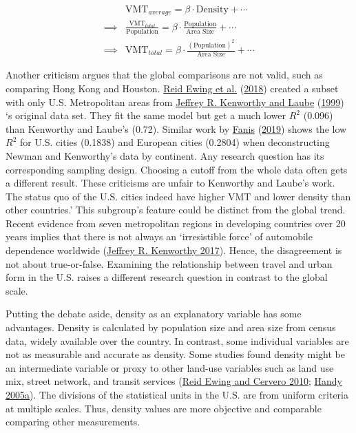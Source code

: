 \documentclass[
  12pt,
]{article}
\begin{document}
\begin{equation}
\begin{split}
 & \text{VMT}_{average}  =\beta\cdot  \text{Density}  +\cdots\\ 
\implies & \frac{\text{VMT}_{total}}{\text{Population}}  = \beta\cdot  \frac{\text{Population}}{\text{Area Size}}  +\cdots\\
\implies & \text{VMT}_{total} = \beta\cdot  \frac{(\text{Population})^2}{\text{Area Size}}  +\cdots
\end{split}
\label{eq:hyperbolic}
\end{equation}

Another criticism argues that the global comparisons are not valid, such as comparing Hong Kong and Houston. \protect\hyperlink{ref-ewingTestingNewmanKenworthy2018}{Reid Ewing et al.} (\protect\hyperlink{ref-ewingTestingNewmanKenworthy2018}{2018}) created a subset with only U.S. Metropolitan areas from \protect\hyperlink{ref-kenworthyPatternsAutomobileDependence1999}{Jeffrey R. Kenworthy and Laube} (\protect\hyperlink{ref-kenworthyPatternsAutomobileDependence1999}{1999}) `s original data set. They fit the same model but get a much lower \(R^2\) (0.096) than Kenworthy and Laube's (0.72). Similar work by \protect\hyperlink{ref-fanisThreeStudiesThat2019}{Fanis} (\protect\hyperlink{ref-fanisThreeStudiesThat2019}{2019}) shows the low \(R^2\) for U.S. cities (0.1838) and European cities (0.2804) when deconstructing Newman and Kenworthy's data by continent. Any research question has its corresponding sampling design. Choosing a cutoff from the whole data often gets a different result. These criticisms are unfair to Kenworthy and Laube's work. The status quo of the U.S. cities indeed have higher VMT and lower density than other countries.' This subgroup's feature could be distinct from the global trend. Recent evidence from seven metropolitan regions in developing countries over 20 years implies that there is not always an `irresistible force' of automobile dependence worldwide (\protect\hyperlink{ref-kenworthyAutomobileDependenceEmerging2017}{Jeffrey R. Kenworthy 2017}). Hence, the disagreement is not about true-or-false. Examining the relationship between travel and urban form in the U.S. raises a different research question in contrast to the global scale.

Putting the debate aside, density as an explanatory variable has some advantages. Density is calculated by population size and area size from census data, widely available over the country. In contrast, some individual variables are not as measurable and accurate as density. Some studies found density might be an intermediate variable or proxy to other land-use variables such as land use mix, street network, and transit services (\protect\hyperlink{ref-ewingTravelBuiltEnvironment2010}{Reid Ewing and Cervero 2010}; \protect\hyperlink{ref-handyCriticalAssessmentLiterature2005}{Handy 2005a}). The divisions of the statistical units in the U.S. are from uniform criteria at multiple scales. Thus, density values are more objective and comparable comparing other measurements.
\end{document}
